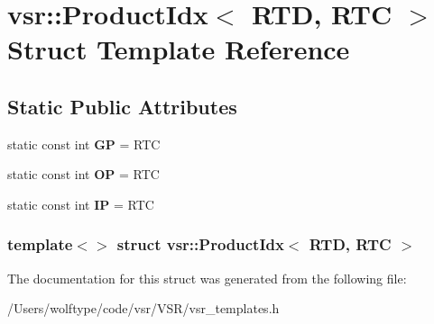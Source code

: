 \hypertarget{structvsr_1_1_product_idx_3_01_r_t_d_00_01_r_t_c_01_4}{\section{vsr\-:\-:Product\-Idx$<$ R\-T\-D, R\-T\-C $>$ Struct Template Reference}
\label{structvsr_1_1_product_idx_3_01_r_t_d_00_01_r_t_c_01_4}
}
\subsection*{Static Public Attributes}
\begin{DoxyCompactItemize}
\item 
\hypertarget{structvsr_1_1_product_idx_3_01_r_t_d_00_01_r_t_c_01_4_ab032ceb26b8985dce0e492c3486eb7f7}{static const int {\bfseries G\-P} = R\-T\-C}\label{structvsr_1_1_product_idx_3_01_r_t_d_00_01_r_t_c_01_4_ab032ceb26b8985dce0e492c3486eb7f7}

\item 
\hypertarget{structvsr_1_1_product_idx_3_01_r_t_d_00_01_r_t_c_01_4_a67393b1ee4b26b80cb9b939e09a9ed8b}{static const int {\bfseries O\-P} = R\-T\-C}\label{structvsr_1_1_product_idx_3_01_r_t_d_00_01_r_t_c_01_4_a67393b1ee4b26b80cb9b939e09a9ed8b}

\item 
\hypertarget{structvsr_1_1_product_idx_3_01_r_t_d_00_01_r_t_c_01_4_a990c56514cf57854ef87eabbd87ad6fb}{static const int {\bfseries I\-P} = R\-T\-C}\label{structvsr_1_1_product_idx_3_01_r_t_d_00_01_r_t_c_01_4_a990c56514cf57854ef87eabbd87ad6fb}

\end{DoxyCompactItemize}
\subsubsection*{template$<$$>$ struct vsr\-::\-Product\-Idx$<$ R\-T\-D, R\-T\-C $>$}



The documentation for this struct was generated from the following file\-:\begin{DoxyCompactItemize}
\item 
/\-Users/wolftype/code/vsr/\-V\-S\-R/vsr\-\_\-templates.\-h\end{DoxyCompactItemize}
